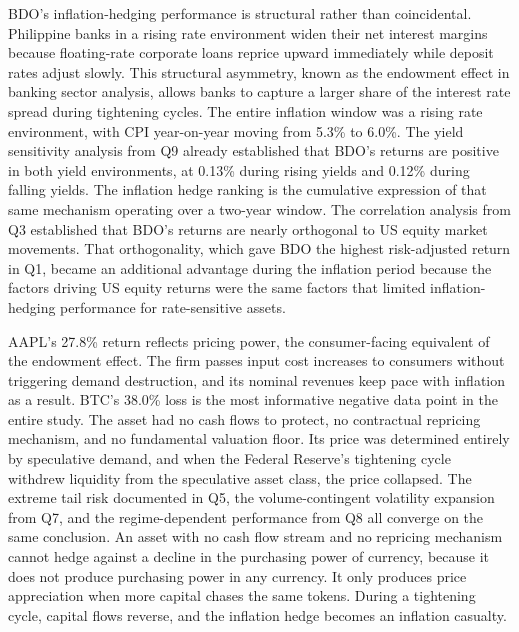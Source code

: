 BDO's inflation-hedging performance is structural rather than coincidental. Philippine banks in a rising rate environment widen their net interest margins because floating-rate corporate loans reprice upward immediately while deposit rates adjust slowly. This structural asymmetry, known as the endowment effect in banking sector analysis, allows banks to capture a larger share of the interest rate spread during tightening cycles. The entire inflation window was a rising rate environment, with CPI year-on-year moving from 5.3\% to 6.0\%. The yield sensitivity analysis from Q9 already established that BDO's returns are positive in both yield environments, at 0.13\% during rising yields and 0.12\% during falling yields. The inflation hedge ranking is the cumulative expression of that same mechanism operating over a two-year window. The correlation analysis from Q3 established that BDO's returns are nearly orthogonal to US equity market movements. That orthogonality, which gave BDO the highest risk-adjusted return in Q1, became an additional advantage during the inflation period because the factors driving US equity returns were the same factors that limited inflation-hedging performance for rate-sensitive assets.

AAPL's 27.8\% return reflects pricing power, the consumer-facing equivalent of the endowment effect. The firm passes input cost increases to consumers without triggering demand destruction, and its nominal revenues keep pace with inflation as a result. BTC's 38.0\% loss is the most informative negative data point in the entire study. The asset had no cash flows to protect, no contractual repricing mechanism, and no fundamental valuation floor. Its price was determined entirely by speculative demand, and when the Federal Reserve's tightening cycle withdrew liquidity from the speculative asset class, the price collapsed. The extreme tail risk documented in Q5, the volume-contingent volatility expansion from Q7, and the regime-dependent performance from Q8 all converge on the same conclusion. An asset with no cash flow stream and no repricing mechanism cannot hedge against a decline in the purchasing power of currency, because it does not produce purchasing power in any currency. It only produces price appreciation when more capital chases the same tokens. During a tightening cycle, capital flows reverse, and the inflation hedge becomes an inflation casualty.

